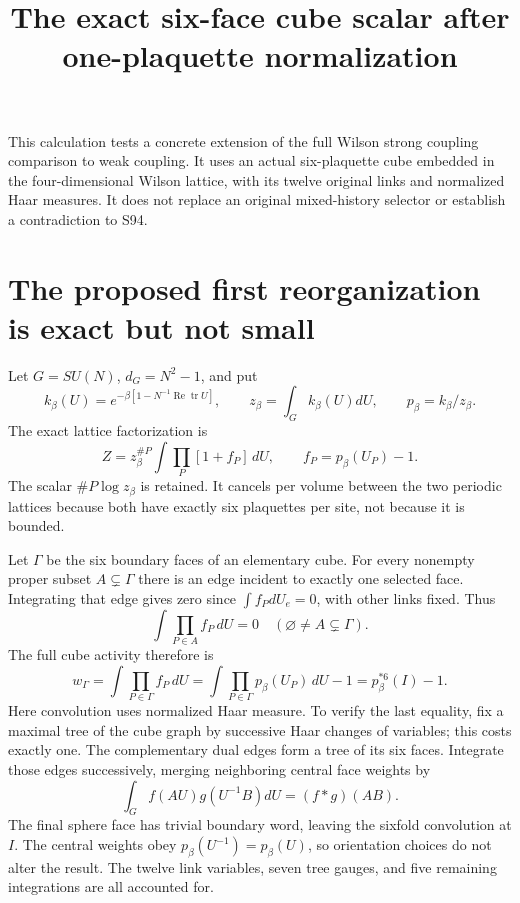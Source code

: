 \documentclass{article}
\title{The exact six-face cube scalar after one-plaquette normalization}\author{}\date{}
\begin{document}
\maketitle
This calculation tests a concrete extension of the full Wilson strong coupling comparison to weak coupling. It uses an actual six-plaquette cube embedded in the four-dimensional Wilson lattice, with its twelve original links and normalized Haar measures. It does not replace an original mixed-history selector or establish a contradiction to S94.

\section{The proposed first reorganization is exact but not small}
Let $G=SU(N)$, $d_G=N^2-1$, and put
\[
 k_\beta(U)=e^{-\beta[1-N^{-1}\operatorname{Re}\operatorname{tr}U]},\qquad
 z_\beta=\int_Gk_\beta(U)dU,\qquad p_\beta=k_\beta/z_\beta.
\]
The exact lattice factorization is
\[
 Z=z_\beta^{\#P}\int\prod_P[1+f_P]\,dU,\qquad f_P=p_\beta(U_P)-1.
 \tag{1}
\]
The scalar $\#P\log z_\beta$ is retained. It cancels per volume between the two periodic lattices because both have exactly six plaquettes per site, not because it is bounded.

Let $\Gamma$ be the six boundary faces of an elementary cube. For every nonempty proper subset $A\subsetneq\Gamma$ there is an edge incident to exactly one selected face. Integrating that edge gives zero since $\int f_PdU_e=0$, with other links fixed. Thus
\[
 \int\prod_{P\in A}f_P\,dU=0\quad
 (\varnothing\ne A\subsetneq\Gamma).
 \tag{2}
\]
The full cube activity therefore is
\[
 w_\Gamma=\int\prod_{P\in\Gamma}f_P\,dU
 =\int\prod_{P\in\Gamma}p_\beta(U_P)\,dU-1
 =p_\beta^{*6}(I)-1.
 \tag{3}
\]
Here convolution uses normalized Haar measure. To verify the last equality, fix a maximal tree of the cube graph by successive Haar changes of variables; this costs exactly one. The complementary dual edges form a tree of its six faces. Integrate those edges successively, merging neighboring central face weights by
\[
 \int_G f(AU)g(U^{-1}B)dU=(f*g)(AB).
\]
The final sphere face has trivial boundary word, leaving the sixfold convolution at $I$. The central weights obey $p_\beta(U^{-1})=p_\beta(U)$, so orientation choices do not alter the result. The twelve link variables, seven tree gauges, and five remaining integrations are all accounted for.
\end{document}
